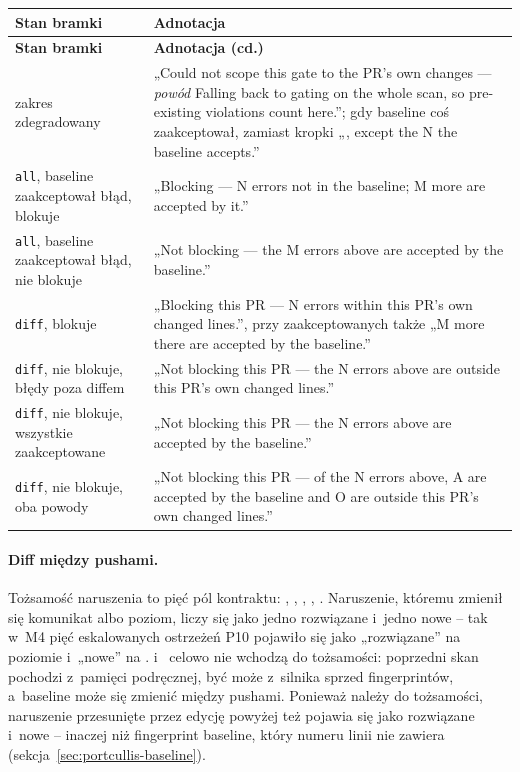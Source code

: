 \begingroup\small
\begin{xltabular}{\linewidth}{@{}>{\raggedright\arraybackslash}p{4.2cm} >{\raggedright\arraybackslash}X@{}}
\toprule
\textbf{Stan bramki} & \textbf{Adnotacja} \\
\midrule
\endfirsthead
\toprule
\textbf{Stan bramki} & \textbf{Adnotacja (cd.)} \\
\midrule
\endhead
zakres zdegradowany & „Could not scope this gate to the PR's own changes — \emph{powód} Falling back to gating on the whole scan, so pre-existing violations count here.”; gdy baseline coś zaakceptował, zamiast kropki „, except the N the baseline accepts.” \\
\texttt{all}, baseline zaakceptował błąd, blokuje & „Blocking — N errors not in the baseline; M more are accepted by it.” \\
\texttt{all}, baseline zaakceptował błąd, nie blokuje & „Not blocking — the M errors above are accepted by the baseline.” \\
\texttt{diff}, blokuje & „Blocking this PR — N errors within this PR's own changed lines.”, przy zaakceptowanych także „M more there are accepted by the baseline.” \\
\texttt{diff}, nie blokuje, błędy poza diffem & „Not blocking this PR — the N errors above are outside this PR's own changed lines.” \\
\texttt{diff}, nie blokuje, wszystkie zaakceptowane & „Not blocking this PR — the N errors above are accepted by the baseline.” \\
\texttt{diff}, nie blokuje, oba powody & „Not blocking this PR — of the N errors above, A are accepted by the baseline and O are outside this PR's own changed lines.” \\
\bottomrule
\end{xltabular}
\endgroup

\paragraph{Diff między pushami.} Tożsamość naruszenia to pięć pól kontraktu:
, , , ,
. Naruszenie, któremu zmienił się komunikat albo poziom, liczy się jako
jedno rozwiązane i~jedno nowe -- tak w~M4 pięć eskalowanych ostrzeżeń P10 pojawiło się jako
„rozwiązane” na poziomie  i~„nowe” na .
 i~ celowo nie wchodzą do tożsamości: poprzedni
skan pochodzi z~pamięci podręcznej, być może z~silnika sprzed fingerprintów, a~baseline
może się zmienić między pushami. Ponieważ  należy do tożsamości, naruszenie
przesunięte przez edycję powyżej też pojawia się jako rozwiązane i~nowe -- inaczej niż
fingerprint baseline, który numeru linii nie zawiera (sekcja~\ref{sec:portcullis-baseline}).


